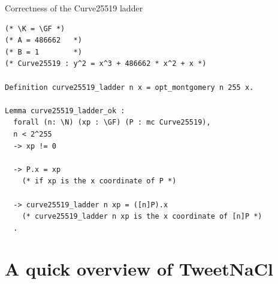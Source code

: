 \documentclass[8pt]{beamer}
\begin{document}
\begin{frame}[fragile]{Correctness of the Curve25519 ladder}
\begin{center}
\begin{lstlisting}[language=Coq, basicstyle=\large]
(* \K = \GF *)
(* A = 486662   *)
(* B = 1        *)
(* Curve25519 : y^2 = x^3 + 486662 * x^2 + x *)

Definition curve25519_ladder n x = opt_montgomery n 255 x.

Lemma curve25519_ladder_ok :
  forall (n: \N) (xp : \GF) (P : mc Curve25519),
  n < 2^255
  -> xp != 0

  -> P.x = xp
    (* if xp is the x coordinate of P *)

  -> curve25519_ladder n xp = ([n]P).x
    (* curve25519_ladder n xp is the x coordinate of [n]P *)
  .
\end{lstlisting}
\end{center}
\end{frame}

\section{A quick overview of TweetNaCl}
\end{document}
